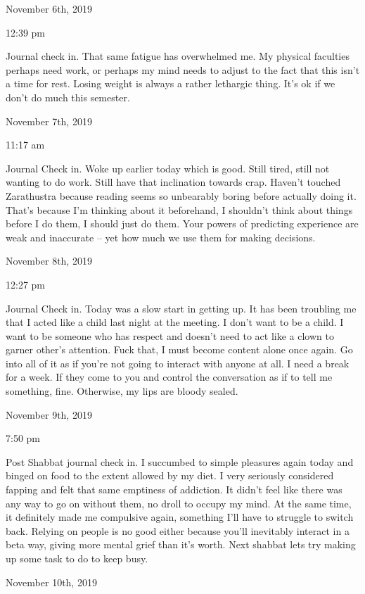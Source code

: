 \bigskip
\bigskip
November 6th, 2019

12:39 pm

Journal check in. That same fatigue has overwhelmed me. My physical
faculties perhaps need work, or perhaps my mind needs to adjust to the
fact that this isn't a time for rest. Losing weight is always a rather
lethargic thing. It's ok if we don't do much this semester.

\bigskip
\bigskip
November 7th, 2019

11:17 am

Journal Check in. Woke up earlier today which is good. Still tired,
still not wanting to do work. Still have that inclination towards crap.
Haven't touched Zarathustra because reading seems so unbearably boring
before actually doing it. That's because I'm thinking about it
beforehand, I shouldn't think about things before I do them, I should
just do them. Your powers of predicting experience are weak and
inaccurate -- yet how much we use them for making decisions.

\bigskip
\bigskip
November 8th, 2019

12:27 pm

Journal Check in. Today was a slow start in getting up. It has been
troubling me that I acted like a child last night at the meeting. I
don't want to be a child. I want to be someone who has respect and
doesn't need to act like a clown to garner other's attention. Fuck that,
I must become content alone once again. Go into all of it as if you're
not going to interact with anyone at all. I need a break for a week. If
they come to you and control the conversation as if to tell me
something, fine. Otherwise, my lips are bloody sealed.

\bigskip
\bigskip
November 9th, 2019

7:50 pm

Post Shabbat journal check in. I succumbed to simple pleasures again
today and binged on food to the extent allowed by my diet. I very
seriously considered fapping and felt that same emptiness of addiction.
It didn't feel like there was any way to go on without them, no droll to
occupy my mind. At the same time, it definitely made me compulsive
again, something I'll have to struggle to switch back. Relying on people
is no good either because you'll inevitably interact in a beta way,
giving more mental grief than it's worth. Next shabbat lets try making
up some task to do to keep busy.

\bigskip
\bigskip
November 10th, 2019

